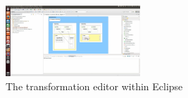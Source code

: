 
\begin{figure}
\centering
\includegraphics[width=0.45\textwidth]{figures/eclipse_frontend}
\caption{The transformation editor within Eclipse}
\label{fig:eclipse_frontend}
\end{figure}




 